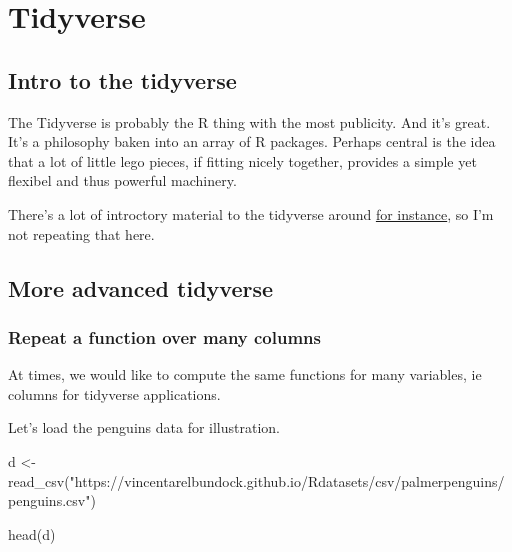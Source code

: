 \documentclass[
  letterpaper,
  DIV=11,
  numbers=noendperiod]{scrreprt}
\newenvironment{Shaded}{\begin{snugshade}}{\end{snugshade}}
\newcommand{\FunctionTok}[1]{\textcolor[rgb]{0.28,0.35,0.67}{#1}}
\newcommand{\NormalTok}[1]{\textcolor[rgb]{0.00,0.23,0.31}{#1}}
\newcommand{\OtherTok}[1]{\textcolor[rgb]{0.00,0.23,0.31}{#1}}
\newcommand{\StringTok}[1]{\textcolor[rgb]{0.13,0.47,0.30}{#1}}
\theoremstyle{definition}
\theoremstyle{definition}
\theoremstyle{remark}
\begin{document}
\hypertarget{tidyverse}{%
\section{Tidyverse}\label{tidyverse}}

\hypertarget{intro-to-the-tidyverse}{%
\subsection{Intro to the tidyverse}\label{intro-to-the-tidyverse}}

The Tidyverse is probably the R thing with the most publicity. And it's
great. It's a philosophy baken into an array of R packages. Perhaps
central is the idea that a lot of little lego pieces, if fitting nicely
together, provides a simple yet flexibel and thus powerful machinery.

There's a lot of introctory material to the tidyverse around
\href{https://datasciencebook.ca/wrangling.html}{for instance}, so I'm
not repeating that here.

\hypertarget{more-advanced-tidyverse}{%
\subsection{More advanced tidyverse}\label{more-advanced-tidyverse}}

\hypertarget{repeat-a-function-over-many-columns}{%
\subsubsection{Repeat a function over many
columns}\label{repeat-a-function-over-many-columns}}

At times, we would like to compute the same functions for many
variables, ie columns for tidyverse applications.

Let's load the penguins data for illustration.

\begin{Shaded}
\begin{Highlighting}[]
\NormalTok{d }\OtherTok{\textless{}{-}} \FunctionTok{read\_csv}\NormalTok{(}\StringTok{"https://vincentarelbundock.github.io/Rdatasets/csv/palmerpenguins/penguins.csv"}\NormalTok{)}

\FunctionTok{head}\NormalTok{(d)}
\end{Highlighting}
\end{Shaded}
\end{document}
